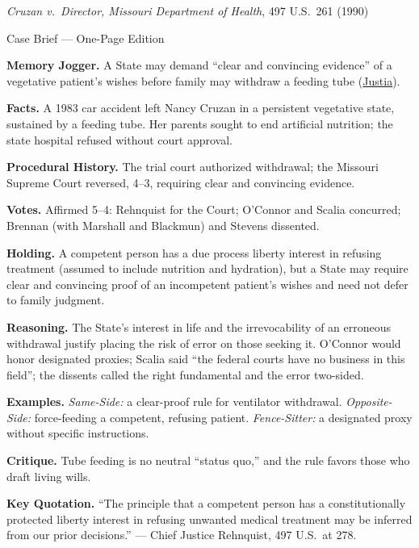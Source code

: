\documentclass[12pt]{article}
\begin{document}
\begin{center}
{\Large \textit{Cruzan v.\ Director, Missouri Department of Health}, 497 U.S.\ 261 (1990)\par}
\vspace{0.3em}
{\normalsize Case Brief --- One-Page Edition\par}
\end{center}

\textbf{Memory Jogger.} A State may demand ``clear and convincing evidence'' of a vegetative patient's wishes before family may withdraw a feeding tube (\href{https://supreme.justia.com/cases/federal/us/497/261/}{Justia}).

\textbf{Facts.} A 1983 car accident left Nancy Cruzan in a persistent vegetative state, sustained by a feeding tube. Her parents sought to end artificial nutrition; the state hospital refused without court approval.

\textbf{Procedural History.} The trial court authorized withdrawal; the Missouri Supreme Court reversed, 4--3, requiring clear and convincing evidence.

\textbf{Votes.} Affirmed 5--4: Rehnquist for the Court; O'Connor and Scalia concurred; Brennan (with Marshall and Blackmun) and Stevens dissented.

\textbf{Holding.} A competent person has a due process liberty interest in refusing treatment (assumed to include nutrition and hydration), but a State may require clear and convincing proof of an incompetent patient's wishes and need not defer to family judgment.

\textbf{Reasoning.} The State's interest in life and the irrevocability of an erroneous withdrawal justify placing the risk of error on those seeking it. O'Connor would honor designated proxies; Scalia said ``the federal courts have no business in this field''; the dissents called the right fundamental and the error two-sided.

\textbf{Examples.} \emph{Same-Side:} a clear-proof rule for ventilator withdrawal. \emph{Opposite-Side:} force-feeding a competent, refusing patient. \emph{Fence-Sitter:} a designated proxy without specific instructions.

\textbf{Critique.} Tube feeding is no neutral ``status quo,'' and the rule favors those who draft living wills.

\textbf{Key Quotation.} ``The principle that a competent person has a constitutionally protected liberty interest in refusing unwanted medical treatment may be inferred from our prior decisions.'' --- Chief Justice Rehnquist, 497 U.S.\ at 278.
\end{document}
